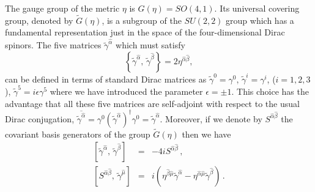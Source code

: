 \documentclass[a4paper,12pt]{article}
\begin{document}
The gauge group of the metric $\eta$ is $G(\eta)=SO(4,1)$. Its universal 
covering group, denoted by $\tilde G(\eta)$, is a subgroup of the $SU(2,2)$   
group which has a fundamental representation just in the space of the 
four-dimensional Dirac spinors. The five matrices 
 $\tilde\gamma^{\hat\alpha}$ which must satisfy
\begin{equation} 
\left\{ \tilde\gamma^{\hat\alpha},\, \tilde\gamma^{\hat\beta} \right\}
=2\eta^{\hat\alpha \hat\beta}, 
\end{equation}
can be defined in terms of standard Dirac matrices \cite{TH,DKK} as 
$\tilde \gamma^{0}=\gamma^{0},\,      
\tilde \gamma^{i}=\gamma^{i}$, ($i=1,2,3$),      
$\tilde \gamma^{5}=i\epsilon\gamma^{5}$ where we have introduced the parameter 
$\epsilon=\pm1$.
This choice has the advantage that all these five matrices are self-adjoint 
with respect to the usual Dirac conjugation, 
$\overline{\tilde\gamma^{\hat\alpha}}=
\gamma^{0}(\tilde\gamma^{\hat\alpha})^{\dagger}\gamma^{0}
=\tilde\gamma^{\hat\alpha}$.
Moreover, if we denote by  $S^{\hat\alpha \hat\beta}$ the covariant basis 
generators of the group $\tilde G(\eta)$ then we have 
\begin{eqnarray}
\left[\tilde\gamma^{\hat\alpha},\, \tilde\gamma^{\hat\beta} \right]
&=& -4iS^{\hat\alpha \hat\beta}\,,\\ 
\left[ S^{\hat\alpha \hat\beta},\, \tilde\gamma^{\hat\mu} \right] &=&
i(\eta^{\hat\beta \hat\mu}\tilde\gamma^{\hat\alpha}-
\eta^{\hat\alpha \hat\mu}\tilde\gamma^{\hat\beta})\,.
\end{eqnarray}
\end{document}
